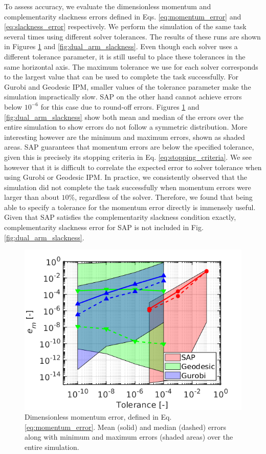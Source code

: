 To assess accuracy, we evaluate the dimensionless momentum and complementarity
slackness errors defined in Eqs. \eqref{eq:momentum_error} and
\eqref{eq:slackness_error} respectively. We perform the simulation of the same
task several times using different solver tolerances. The results of these runs
are shown in Figures \ref{fig:dual_arm_momentum} and
\ref{fig:dual_arm_slackness}. Even though each solver uses a different tolerance
parameter, it is still useful to place these tolerances in the same horizontal
axis. The maximum tolerance we use for each solver corresponds to the largest
value that can be used to complete the task successfully. For Gurobi and
Geodesic IPM, smaller values of the tolerance parameter make the simulation
impractically slow. SAP on the other hand cannot achieve errors below $10^{-6}$
for this case due to round-off errors. Figures \ref{fig:dual_arm_momentum} and
\ref{fig:dual_arm_slackness} show both mean and median of the errors over the
entire simulation to show errors do not follow a symmetric distribution. More
interesting however are the minimum and maximum errors, shown as shaded areas.
SAP guarantees that momentum errors are below the specified tolerance, given
this is precisely its stopping criteria in Eq. \eqref{eq:stopping_criteria}. We
see however that it is difficult to correlate the expected error to solver
tolerance when using Gurobi or Geodesic IPM. In practice, we consistently
observed that the simulation did not complete the task successfully when
momentum errors were larger than about $10\%$, regardless of the solver.
Therefore, we found that being able to specify a tolerance for the momentum
error directly is immensely useful. Given that SAP satisfies the complementarity
slackness condition exactly, complementarity slackness error for SAP is not
included in Fig. \ref{fig:dual_arm_slackness}.

\begin{figure}[!h]
	\centering
    \includegraphics[width=0.7\columnwidth]{figures/dual_arm/momentum_error.png}
    \caption{\label{fig:dual_arm_momentum} Dimensionless momentum error, defined
    in Eq. \eqref{eq:momentum_error}. Mean (solid) and median (dashed) errors
    along with minimum and maximum errors (shaded areas) over the entire
    simulation.}
\end{figure}

